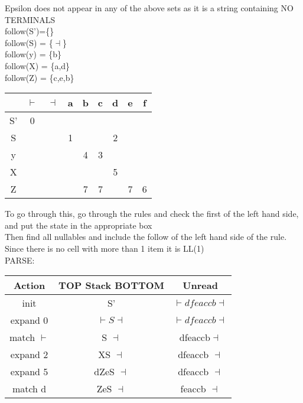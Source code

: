 \documentclass[12pt]{article}
\begin{document}
	Epsilon does not appear in any of the above sets as it is a string containing NO TERMINALS\\
	
	follow(S')=\{\}\\
	follow(S) = \{$\dashv$\}\\
	follow(y) = \{b\}\\
	follow(X) = \{a,d\}\\
	follow(Z) = \{c,e,b\}\\
	
	\begin{tabular}{c | c | c | c | c | c | c | c | c}
		& $\vdash$ & $\dashv$ & a & b & c & d & e & f \\ \hline
		S'& 0 & & & & & & & \\
		S & & & 1 & & & 2 & & \\
		y & & & & 4 & 3 & & & \\
		X & & & & & & 5 & & \\
		Z & & & & 7 & 7 & & 7 & 6 \\
	\end{tabular}
	
	To go through this, go through the rules and check the first of the left hand side, and put the state in the appropriate box\\
	Then find all nullables and include the follow of the left hand side of the rule.\\
	
	Since there is no cell with more than 1 item it is LL(1)\\
	
	PARSE:\\
	\begin{tabular}{c | c | c }
		Action & TOP Stack BOTTOM & Unread \\ \hline
		init & S' & $\vdash dfeaccb \dashv$ \\
		expand 0 & $\vdash S \dashv$ & $\vdash dfeaccb \dashv$\\
		match $\vdash$ & S $\dashv$ & dfeaccb$\dashv$\\
		expand 2 & XS $\dashv$ & dfeaccb $\dashv$\\
		expand 5 & dZeS $\dashv$ & dfeaccb $\dashv$\\
		match d & ZeS $\dashv$ & feaccb $\dashv$\\
	\end{tabular}
	
\end{document}
